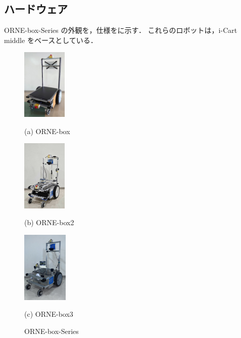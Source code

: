 \documentclass[twocolumn, 9pt]{jsproceedings}
\begin{document}
\subsection{ハードウェア}
ORNE-box-Series の外観を，仕様をに示す．
これらのロボットは，i-Cart middle\cite{icart} をベースとしている．

\begin{figure}[h]
  \centering
  \begin{minipage}[b]{0.3\linewidth}
    \centering
    \includegraphics[width=21.1mm]{fig/box.pdf}
    \caption*{(a) ORNE-box}
  \end{minipage} 
  \hspace{-1.2mm}
  \begin{minipage}[b]{0.3\linewidth}
    \centering
    \includegraphics[height=34mm]{fig/box2.pdf}
    \caption*{(b) ORNE-box2}
  \end{minipage}
  \begin{minipage}[b]{0.3\linewidth}
    \centering
    \includegraphics[height=34mm]{fig/box3.pdf}
    \caption*{(c) ORNE-box3}
  \end{minipage}
  \caption{ORNE-box-Series}
  \label{fig:orne-series}
\end{figure}

\vspace*{-4mm}
\end{document}

